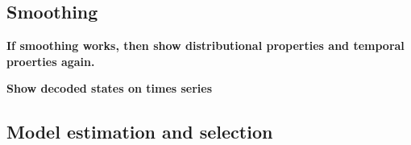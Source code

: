 \subsection{Smoothing}



\textbf{If smoothing works, then show distributional properties and temporal proerties again.}

\textbf{Show decoded states on times series}

\subsection{Model estimation and selection}
\label{Subsection: Model estimation and selection}
